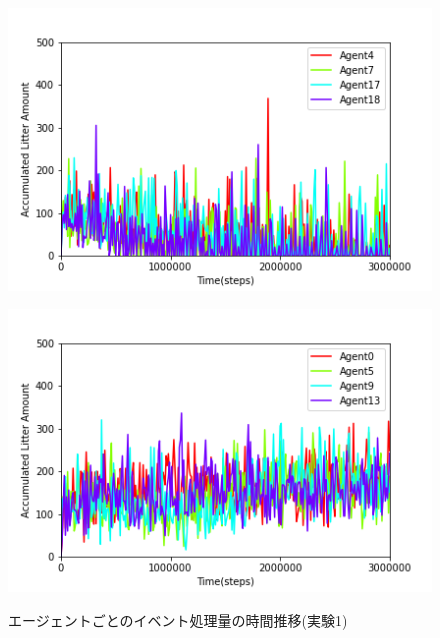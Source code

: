 \documentclass[12pt,a4j,twoside]{jarticle}
\begin{document}
  \begin{figure}
    \begin{minipage}[t]{0.48\columnwidth}
      \centering
      \includegraphics[keepaspectratio, width=\linewidth]{figures/al_graph_ER_Office_top.png}\\
      \label{fig:al_ER_Office_top}
    \end{minipage}
    \hfill
    \begin{minipage}[t]{0.48\columnwidth}
      \centering
      \includegraphics[keepaspectratio, width=\linewidth]{figures/al_graph_ER_Office_worst.png}\\
      \label{fig:al_ER_Office_least}
    \end{minipage}
    \caption{エージェントごとのイベント処理量の時間推移(実験1)}
    \label{fig:al_ER_Office}
  \end{figure}~\begin{figure}[t]

\end{figure}
\end{document}
